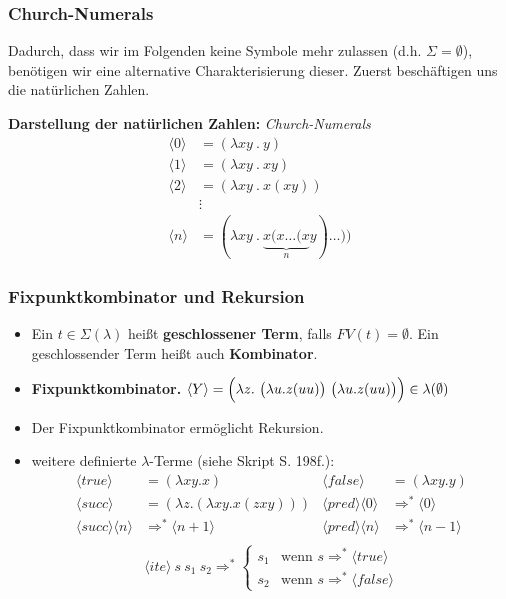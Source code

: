 \documentclass{beamer}
\newcommand{\num}[1]{\ensuremath{\langle #1 \rangle}}
\begin{document}
\begin{frame} \frametitle{Church-Numerals}
	Dadurch, dass wir im Folgenden keine Symbole mehr zulassen (d.h. $\Sigma = \emptyset$), benötigen wir eine alternative Charakterisierung dieser.
	Zuerst beschäftigen uns die natürlichen Zahlen.
	
	\textbf{Darstellung der natürlichen Zahlen:} \textit{Church-Numerals} 
	\begin{align*}
		\num{0} &= (\lambda xy \ . \ y) \\ 
		\num{1} &= (\lambda xy \ . \ xy) \\
		\num{2} &= (\lambda xy \ . \ x(xy)) \\
		&\vdots \\
		\num{n} &= (\lambda xy \ . \ \underbrace{x (x \dots (x}_n y ) \dots ))
	\end{align*}
\end{frame}


\begin{frame} \frametitle{Fixpunktkombinator und Rekursion}
	\begin{itemize}
		\item Ein $t \in \Sigma(\lambda)$ heißt \textbf{geschlossener Term}, falls $FV(t) = \emptyset$. Ein geschlossender Term heißt auch \textbf{Kombinator}.
		\item \textbf{Fixpunktkombinator.} $\num{Y} = \Bigl( \lambda z . \ \bigl( \lambda u . z (uu) \bigr) \ \bigl( \lambda u. z (uu) \bigr) \Bigr) \in \lambda(\emptyset)$
		\item Der Fixpunktkombinator ermöglicht Rekursion.
		\item weitere definierte $\lambda$-Terme (siehe Skript S. 198f.):
		\begin{align*}
			\num{true} &= (\lambda xy. x) & \num{false} &= (\lambda xy. y) \\
			\num{succ} &= (\lambda z . (\lambda xy . x (zxy))) &  \num{pred}\num{0} &\Rightarrow^\ast \num{0} \\
			\num{succ}\num{n} &\Rightarrow^\ast \num{n+1} & 
			\num{pred}\num{n} &\Rightarrow^\ast \num{n-1} \\
		\end{align*}
		\begin{equation*}
			\num{ite} \ s \ s_1 \ s_2 \Rightarrow^\ast \begin{cases}
			s_1 & \text{wenn } s \Rightarrow^\ast \num{true} \\
			s_2 & \text{wenn } s \Rightarrow^\ast \num{false}
			\end{cases}
		\end{equation*}
	\end{itemize}
\end{frame}
\end{document}
